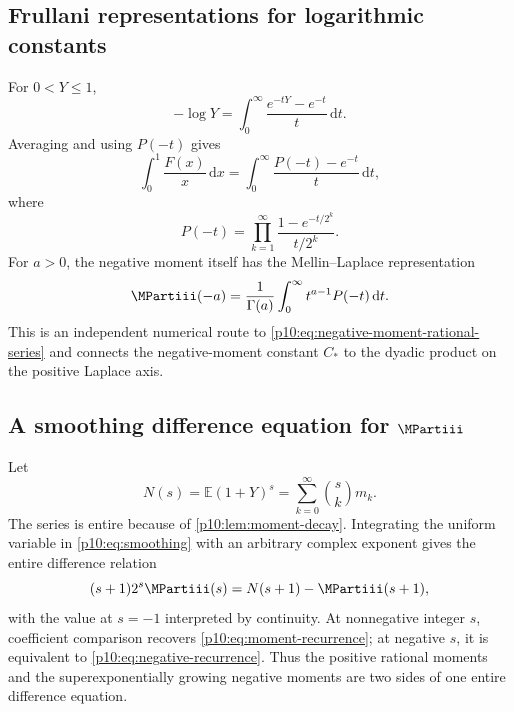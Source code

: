 \documentclass[11pt,oneside]{article}
\theoremstyle{definition}
\theoremstyle{remark}
\newcommand{\F}{F}
\newcommand{\E}{\mathbb E}
\newcommand{\dd}{\,\mathrm d}
\newcommand{\1}{\mathbf 1}
\begin{document}
\subsection{Frullani representations for logarithmic constants}

For \(0<Y\le1\),
\begin{equation}\label{p10:eq:Frullani-log}
 -\log Y=\int_0^\infty\frac{e^{-tY}-e^{-t}}t\dd t.
\end{equation}
Averaging and using \(P(-t)\) gives
\begin{equation}\label{p10:eq:log-Frullani-product}
 \int_0^1\frac{\F(x)}x\dd x
 =\int_0^\infty\frac{P(-t)-e^{-t}}t\dd t,
\end{equation}
where
\begin{equation}\label{p10:eq:Pminus-product}
 P(-t)=\prod_{k=1}^{\infty}
 \frac{1-e^{-t/2^k}}{t/2^k}.
\end{equation}
For \(a>0\), the negative moment itself has the Mellin--Laplace representation
\begin{equation}\label{p10:eq:negative-Mellin-Laplace}
 \MPartiii(-a)=\frac1{\Gamma(a)}\int_0^\infty t^{a-1}P(-t)\dd t.
\end{equation}
This is an independent numerical route to \cref{p10:eq:negative-moment-rational-series} and
connects the negative-moment constant \(C_*\) to the dyadic product on the positive
Laplace axis.

\subsection{A smoothing difference equation for \texorpdfstring{\(\MPartiii\)}{M}}

Let
\begin{equation}\label{p10:eq:Ndef}
 N(s)=\E(1+Y)^s
 =\sum_{k=0}^{\infty}\binom skm_k.
\end{equation}
The series is entire because of \cref{p10:lem:moment-decay}.  Integrating the uniform
variable in \cref{p10:eq:smoothing} with an arbitrary complex exponent gives the entire
difference relation
\begin{equation}\label{p10:eq:M-difference}
 (s+1)2^s\MPartiii(s)=N(s+1)-\MPartiii(s+1),
\end{equation}
with the value at \(s=-1\) interpreted by continuity.  At nonnegative integer \(s\),
coefficient comparison recovers \cref{p10:eq:moment-recurrence}; at negative \(s\), it is
equivalent to \cref{p10:eq:negative-recurrence}.  Thus the positive rational moments and
the superexponentially growing negative moments are two sides of one entire
difference equation.
\end{document}
